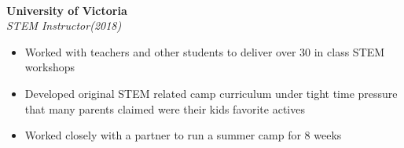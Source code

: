 \documentclass{article}
\newcommand{\grayhline}{
  \noindent\makebox[\linewidth]{\textcolor{gray}{\rule{0.95\textwidth}{1pt}}}\\
}
\newcommand{\minicolumns}[2]{
  \begin{minipage}[t]{0.25\textwidth}
    \begin{flushright}
      #1
    \end{flushright}
  \end{minipage}
  \hfill
  \begin{minipage}[t]{0.7\textwidth}
    #2
  \end{minipage}
}
\newcommand{\resumeSection}[3]{
  \minicolumns{
      \textbf{#1}\\
      \textit{#2}
    }
    {
      \begin{itemize}[leftmargin=*]
          \justifying
          \setlength\itemsep{-0.1em}
          #3
      \end{itemize}
  }
  \vspace{0.5\baselineskip}
}
\begin{document}
\grayhline
\vspace{0.5\baselineskip}
\resumeSection{University of Victoria}{STEM Instructor(2018)}{
  \item Worked with teachers and other students to deliver over 30 in class STEM workshops
  \item Developed original STEM related camp curriculum under tight time pressure
  that many parents claimed were their kids favorite actives
  \item Worked closely with a partner to run a summer camp for 8 weeks
}
\end{document}
